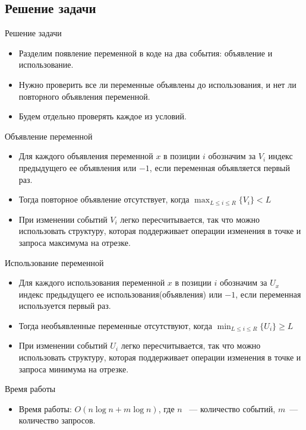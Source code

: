 \subsection{Решение задачи}

\begin{frame}[t]{Решение задачи}
\begin{itemize}
	\item Разделим появление переменной в коде на два события: объявление и использование.
	\item Нужно проверить все ли переменные объявлены до использования, и нет ли повторного объявления переменной.
	\item Будем отдельно проверять каждое из условий.
\end{itemize}
\end{frame}


\begin{frame}[t]{Объявление переменной}
	\begin{itemize}
		\item Для каждого объявления переменной $x$ в позиции $i$ обозначим за $V_{i}$ индекс предыдущего ее объявления или $-1$, если переменная объявляется первый раз.
		\item Тогда повторное объявление отсутствует, когда $\max_{L \le i \le R}\{V_{i}\} < L$
		\item При изменении событий $V_{i}$ легко пересчитывается, так что можно использовать структуру, которая поддерживает операции изменения в точке и запроса максимума на отрезке.
		
	\end{itemize}
\end{frame}

\begin{frame}[t]{Использование переменной}
	\begin{itemize}
		\item Для каждого использования переменной $x$ в позиции $i$ обозначим за $U_{x}$ индекс предыдущего ее использования(объявления) или $-1$, если переменная используется первый раз.
		\item Тогда необъявленные переменные отсутствуют, когда $\min_{L \le i \le R}\{U_{i}\} \ge L$
		\item При изменении событий $U_{i}$ легко пересчитывается, так что можно использовать структуру, которая поддерживает операции изменения в точке и запроса минимума на отрезке.
		 
	\end{itemize}
\end{frame}

\begin{frame}[t]{Время работы}
	\begin{itemize}
		\item Время работы: $O(n\log n + m\log n)$, где $n$ ~--- количество событий, $m$~--- количество запросов.
	\end{itemize}
\end{frame}
